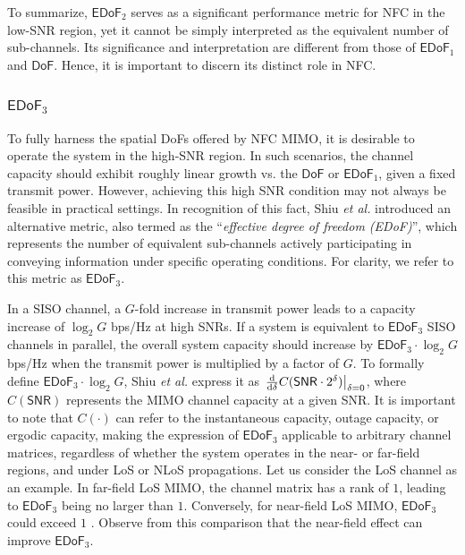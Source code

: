 \documentclass[journal]{IEEEtran}
\theoremstyle{definition}
\begin{document}
To summarize, ${\mathsf{EDoF}}_2$ serves as a significant performance metric for NFC in the low-SNR region, yet it cannot be simply interpreted as the equivalent number of sub-channels. Its significance and interpretation are different from those of ${\mathsf{EDoF}}_1$ and ${\mathsf{DoF}}$. Hence, it is important to discern its distinct role in NFC.



\subsubsection{${\mathsf{EDoF}}_3$}
To fully harness the spatial DoFs offered by NFC MIMO, it is desirable to operate the system in the high-SNR region. In such scenarios, the channel capacity should exhibit roughly linear growth vs. the ${\mathsf{DoF}}$ or ${\mathsf{EDoF}}_1$, given a fixed transmit power. However, achieving this high SNR condition may not always be feasible in practical settings. In recognition of this fact, Shiu \emph{et al.} \cite{Shiu2000} introduced an alternative metric, also termed as the ``\emph{effective degree of freedom (EDoF)}'', which represents the number of equivalent sub-channels actively participating in conveying information under specific operating conditions. For clarity, we refer to this metric as ${\mathsf{EDoF}}_3$.

In a SISO channel, a $G$-fold increase in transmit power leads to a capacity increase of $\log_2{G}$ bps/Hz at high SNRs. If a system is equivalent to ${\mathsf{EDoF}}_3$ SISO channels in parallel, the overall system capacity should increase by ${\mathsf{EDoF}}_3\cdot\log_2{G}$ bps/Hz when the transmit power is multiplied by a factor of $G$. To formally define ${\mathsf{EDoF}}_3\cdot\log_2{G}$, Shiu \emph{et al.} \cite{Shiu2000} express it as $\left.\frac{{\rm{d}}}{{\rm{d}}\delta}C({\mathsf{SNR}}\cdot2^{\delta})\right|_{\delta=0}$, where $C({\mathsf{SNR}})$ represents the MIMO channel capacity at a given SNR. It is important to note that $C(\cdot)$ can refer to the instantaneous capacity, outage capacity, or ergodic capacity, making the expression of ${\mathsf{EDoF}}_3$ applicable to arbitrary channel matrices, regardless of whether the system operates in the near- or far-field regions, and under LoS or NLoS propagations. Let us consider the LoS channel as an example. In far-field LoS MIMO, the channel matrix has a rank of $1$, leading to ${\mathsf{EDoF}}_3$ being no larger than $1$. Conversely, for near-field LoS MIMO, ${\mathsf{EDoF}}_3$ could exceed $1$ \cite{Shiu2000}. Observe from this comparison that the near-field effect can improve ${\mathsf{EDoF}}_3$.
\end{document}
